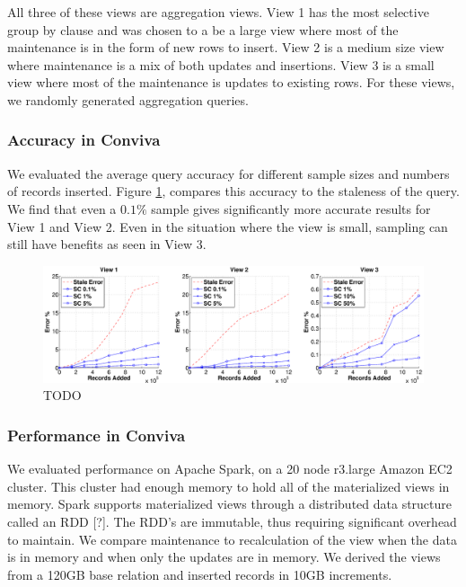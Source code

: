 All three of these views are aggregation views. 
View 1 has the most selective group by clause and was chosen to a be a large view where most of the maintenance is in the form of new rows to insert.
View 2 is a medium size view where maintenance is a mix of both updates and insertions.
View 3 is a small view where most of the maintenance is updates to existing rows.
For these views, we randomly generated aggregation queries.

\subsubsection{Accuracy in Conviva}
We evaluated the average query accuracy for different sample sizes and numbers of records inserted.
Figure \ref{exp5conviva}, compares this accuracy to the staleness of the query.
We find that even a $0.1\%$ sample gives significantly more accurate results for View 1 and View 2.
Even in the situation where the view is small, sampling can still have benefits as seen in View 3.

\begin{figure}[h]
\label{exp5conviva}
\centering
\includegraphics[width=\textwidth]{exp/exp5-coniva-accuracy.eps}
 \caption{TODO}
\end{figure}

\subsubsection{Performance in Conviva}
We evaluated performance on Apache Spark, on a 20 node r3.large Amazon EC2 cluster. 
This cluster had enough memory to hold all of the materialized views in memory.
Spark supports materialized views through a distributed data structure called an RDD [?].
The RDD's are immutable, thus requiring significant overhead to maintain.
We compare maintenance to recalculation of the view when the data is in memory and when only the updates are in memory. 
We derived the views from a 120GB base relation and inserted records in 10GB increments.

